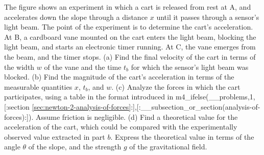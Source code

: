  The figure shows an experiment in which a cart is
released from rest at A, and accelerates down the slope
through a distance $x$ until it passes through a sensor's
light beam. The point of the experiment is to determine the
cart's acceleration. At B, a cardboard vane mounted on the
cart enters the light beam, blocking the light beam, and
starts an electronic timer running. At C, the vane emerges
from the beam, and the timer stops.\hwendpart
 (a) Find the final
velocity of the cart in terms of the width $w$ of the vane
and the time $t_b$ for which the sensor's light beam was
blocked.\answercheck\hwendpart
 (b) Find the magnitude of the cart's acceleration
in terms of the measurable quantities $x$, $t_b$, and $w$.\answercheck\hwendpart
(c) Analyze the forces in which the cart participates, using
a table in the format introduced in m4_ifelse(__problems,1,[:section \ref{sec:newton-2-analysis-of-forces}:],[:__subsection_or_section(analysis-of-forces):]). Assume
friction is negligible.\hwendpart
(d) Find a theoretical value for the
acceleration of the cart, which could be compared with the
experimentally observed value extracted in part $b$. Express
the theoretical value in terms of the angle $\theta $ of the
slope, and the strength $g$ of the gravitational field.\answercheck
